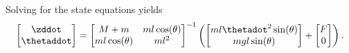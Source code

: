 \documentclass[10pt]{article}
\begin{document}
Solving for the state equations yields
\begin{equation}
  \begin{bmatrix}
    \zddot\\ \thetaddot
  \end{bmatrix}
  =
  \begin{bmatrix}
    M+m & ml\cos(\theta)\\ ml\cos(\theta) & ml^2
  \end{bmatrix}^{-1}
  \left(
  \begin{bmatrix}
    ml\thetadot^2\sin(\theta)\\ mgl\sin(\theta)
  \end{bmatrix}
  +
  \begin{bmatrix}
    F \\ 0
  \end{bmatrix}
\right).
\end{equation}
\end{document}
